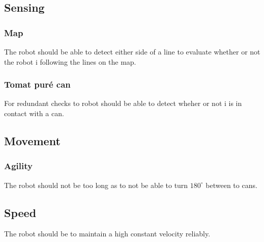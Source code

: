 \documentclass[../../main.tex]{subfiles}
\begin{document}
\subsection{Sensing}%
\label{sub:sensing}

\subsubsection{Map}%
\label{ssub:map}


The robot should be able to detect either side of a line to evaluate whether or not the robot
i following the lines on the map.


\subsubsection{Tomat puré can}%
\label{ssub:tomat_pure_can}

For redundant checks to robot should be able to detect wheher or not i is in contact with a can.

\subsection{Movement}%
\label{sub:movement}


\subsubsection{Agility}%
\label{ssub:agility}

The robot should not be too long as to not be able to turn $180^{\circ}$ between to cans.

\subsection{Speed}%
\label{sub:speed}

The robot should be to maintain a high constant velocity reliably.







	
\end{document}
